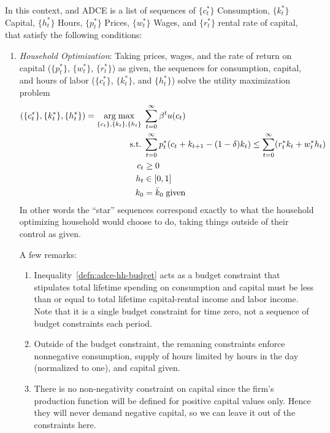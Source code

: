 \documentclass[12pt]{article}
\theoremstyle{plain}
\theoremstyle{definition}
\theoremstyle{remark}
\DeclareMathOperator*{\argmax}{arg\;max}
\newcommand{\sumtinfz}{\sum^\infty_{t=0}}
\begin{document}
In this context, and ADCE is a list of sequences of
$\{c_t^*\}$  Consumption,
$\{k_t^*\}$  Capital,
$\{h_t^*\}$  Hours,
$\{p_t^*\}$  Prices,
$\{w_t^*\}$  Wages, and
$\{r_t^*\}$  rental rate of capital,
that satisfy the following conditions:
\begin{enumerate}
  \item \emph{Household Optimization}: Taking prices,
    wages, and the rate of return on capital
    ($\{p^*_t\}$, $\{w^*_t\}$, $\{r^*_t\}$) as given, the
    sequences for consumption, capital, and hours of labor
    ($\{c_t^*\}$, $\{k_t^*\}$, and $\{h_t^*\}$)
    solve the utility maximization problem
    \begin{align}
      (\{c_t^*\}, \{k_t^*\}, \{h_t^*\})
      =
      \argmax_{\{c_t\}, \{k_t\}, \{h_t\}}
        \; &\sumtinfz \beta^t u(c_t)
        \label{defn:adce-hh-objfcn}\\
      \text{s.t.} \; &
        \sumtinfz p^*_t(c_t + k_{t+1}-(1-\delta)k_t) \leq
        \sumtinfz (r^*_t k_t + w^*_t h_t)
        \label{defn:adce-hh-budget}\\
      c_t &\geq 0 \notag\\
      h_t &\in [0,1] \notag\\
      k_0 &= \bar{k}_0 \; \text{given} \notag
    \end{align}
    In other words the ``star'' sequences correspond exactly to what the
    household optimizing household would choose to do, taking things
    outside of their control as given.

    A few remarks:
    \begin{enumerate}
      \item Inequality~\ref{defn:adce-hh-budget} acts as a budget
        constraint that stipulates total lifetime spending on
        consumption and capital must be less than or equal to total
        lifetime capital-rental income and labor income. Note that it is
        a single budget constraint for time zero, not a sequence of
        budget constraints each period.

      \item Outside of the budget constraint, the remaning constraints
        enforce nonnegative consumption, supply of hours limited by
        hours in the day (normalized to one), and capital given.

      \item There is no non-negativity constraint on capital since the
        firm's production function will be defined for positive capital
        values only. Hence they will never demand negative capital, so
        we can leave it out of the constraints here.


\end{enumerate}
\end{enumerate}
\end{document}
